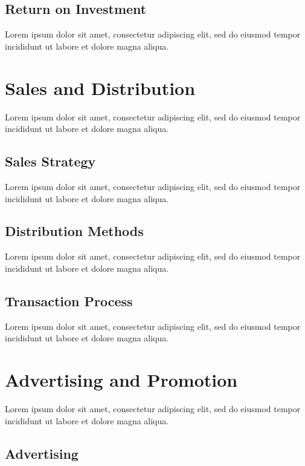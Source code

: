 \subsection{Return on Investment}

Lorem ipsum dolor sit amet, consectetur adipiscing elit, sed do eiusmod tempor incididunt ut labore et dolore magna aliqua.


\section{Sales and Distribution}

Lorem ipsum dolor sit amet, consectetur adipiscing elit, sed do eiusmod tempor incididunt ut labore et dolore magna aliqua.

\subsection{Sales Strategy}

Lorem ipsum dolor sit amet, consectetur adipiscing elit, sed do eiusmod tempor incididunt ut labore et dolore magna aliqua.

\subsection{Distribution Methods}

Lorem ipsum dolor sit amet, consectetur adipiscing elit, sed do eiusmod tempor incididunt ut labore et dolore magna aliqua.

\subsection{Transaction Process}

Lorem ipsum dolor sit amet, consectetur adipiscing elit, sed do eiusmod tempor incididunt ut labore et dolore magna aliqua.


\section{Advertising and Promotion}

Lorem ipsum dolor sit amet, consectetur adipiscing elit, sed do eiusmod tempor incididunt ut labore et dolore magna aliqua.

\subsection{Advertising}

